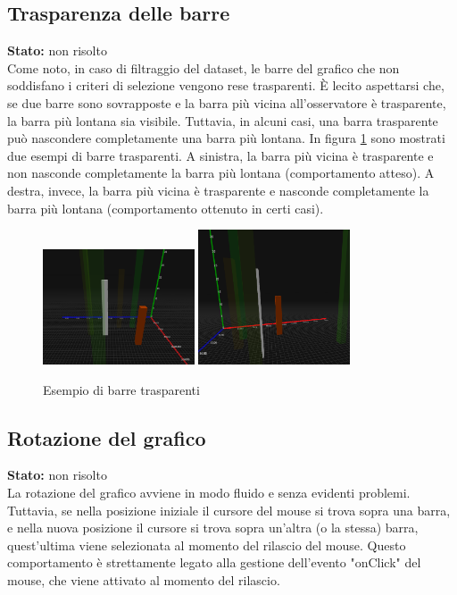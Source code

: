\subsection{Trasparenza delle barre}
\textbf{Stato:} non risolto\\
Come noto, in caso di filtraggio del dataset, le barre del grafico
che non soddisfano i criteri di selezione vengono rese trasparenti.
È lecito aspettarsi che, se due barre sono sovrapposte e la barra più vicina all'osservatore
è trasparente, la barra più lontana sia visibile. Tuttavia, in alcuni casi,
una barra trasparente può nascondere completamente una barra più lontana.
In figura \ref{fig:trasparenza} sono mostrati due esempi di barre trasparenti.
A sinistra, la barra più vicina è trasparente e non nasconde
completamente la barra più lontana (comportamento atteso). A destra, invece,
la barra più vicina è trasparente e nasconde completamente la barra 
più lontana (comportamento ottenuto in certi casi).
\begin{figure}[h!]
    \centering
    \includegraphics[width=0.4\textwidth]{template/images/barreok.png}
    \hspace{0.5cm}
    \includegraphics[width=0.4\textwidth]{template/images/barre.png}
    \caption{Esempio di barre trasparenti}
    \label{fig:trasparenza}
\end{figure}

\subsection{Rotazione del grafico}
\textbf{Stato:} non risolto\\
La rotazione del grafico avviene in modo fluido e senza evidenti problemi. Tuttavia,
se nella posizione iniziale il cursore del mouse si trova sopra una barra, e
nella nuova posizione il cursore si trova sopra un'altra (o la stessa) barra,
quest'ultima viene selezionata al momento del rilascio del mouse.
Questo comportamento è strettamente legato alla
gestione dell'evento "onClick" del mouse, che viene attivato al momento del rilascio.